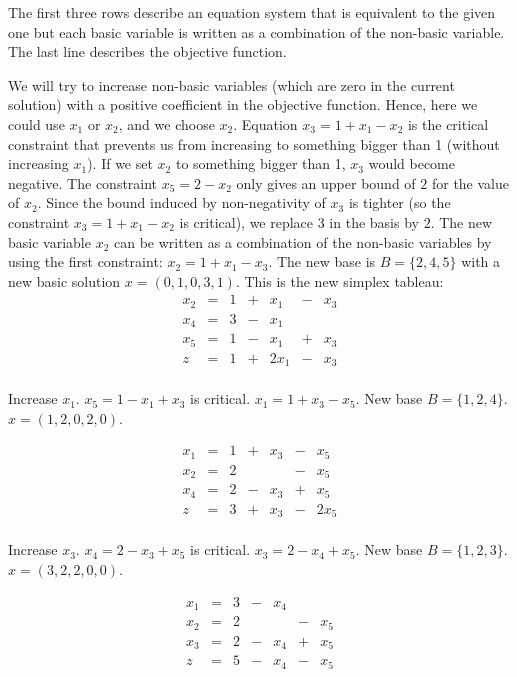\documentclass[12pt, showidx, twoside]{article}
\begin{document}
{{{The first three rows describe an equation system that is equivalent
to the given one but each basic variable is written as a combination of
the non-basic variable. The last line describes the objective function.

We will try to increase non-basic variables (which are zero in the current 
solution) with a positive coefficient in the objective function.
Hence, here we could use $x_1$ or $x_2$, and we choose $x_2$.
Equation $x_3 = 1 + x_1 - x_2$ is the critical constraint that prevents us from
increasing to something bigger than 1 (without increasing $x_1$).
If we set $x_2$ to something bigger than 1, $x_3$ would become negative.
The constraint $x_5  = 2 - x_2$ only gives an upper bound of $2$ for the
value of $x_2$. Since the bound induced by non-negativity of $x_3$ is
tighter (so the constraint $x_3 = 1 + x_1 - x_2$ is critical),
we replace $3$ in the basis by $2$. The new 
basic variable $x_2$ can be written as a combination of the non-basic 
variables by using the first constraint:
$x_2 = 1 + x_1 - x_3$. The new base is $B = \{2,4,5\}$ with a new basic solution
$x = (0,1,0,3,1)$.
This is the new simplex tableau:
\[
\begin{array}{ccccccc}
x_2 & = & 1 & + &  x_1 & - & x_3 \\
x_4 & = & 3 & - &  x_1 &   &     \\
x_5 & = & 1 & - &  x_1 & + & x_3 \\ \hline
z   & = & 1 & + & 2x_1 & - & x_3 \\
\end{array}
\]

Increase $x_1$. $x_5 = 1 - x_1 + x_3$ is critical.
$x_1 = 1 + x_3 - x_5$.  New base $B = \{1,2,4\}$.
$x = (1,2,0,2,0)$.

\[
\begin{array}{ccccccc}
x_1 & = & 1 & + &  x_3 & - &  x_5 \\ 
x_2 & = & 2 &   &      & - &  x_5 \\
x_4 & = & 2 & - &  x_3 & + &  x_5 \\ \hline
z   & = & 3 & + &  x_3 & - & 2x_5 \\
\end{array}
\]

Increase $x_3$. $x_4 = 2 - x_3 + x_5$ is critical.
$x_3 = 2 - x_4 + x_5$. New base $B = \{1,2,3\}$.
$x = (3,2,2,0,0)$.

\[
\begin{array}{ccccccc}
x_1 & = & 3 & - &  x_4 &   &      \\ 
x_2 & = & 2 &   &      & - &  x_5 \\
x_3 & = & 2 & - &  x_4 & + &  x_5 \\ \hline
z   & = & 5 & - &  x_4 & - &  x_5 \\
\end{array}
\]

}}}
\end{document}
